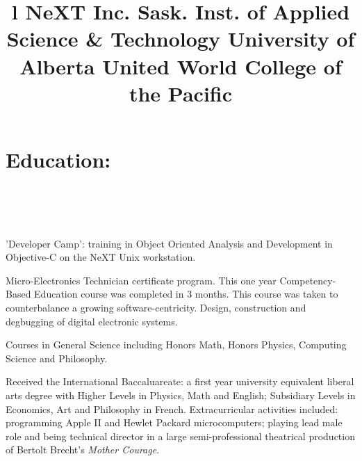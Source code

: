 \begin{resume}
\begin{position}
\end{position}


\section{Education:}

\begin{format}
\title{l}\\
\\
\body\\
\end{format}


\title{ NeXT Inc. }
\employer{}
\begin{position}
'Developer Camp': training in Object Oriented Analysis and Development in 
Objective-C on the NeXT Unix workstation.
\end{position}



\title{ Sask. Inst. of Applied Science \& Technology}
\begin{position}
Micro-Electronics Technician certificate program.  This one year
Competency-Based Education course was completed in 3 months.  This course
was taken to counterbalance a growing software-centricity.  Design, 
construction and degbugging of digital electronic systems.
\end{position}


\title{ University of Alberta}
\begin{position}
Courses in General Science including Honors Math, Honors Physics,
Computing Science and Philosophy.
\end{position}


\title{ United World College of the Pacific}
\begin{position}
Received the International Baccaluareate: a first year university 
equivalent liberal arts degree with Higher Levels in Physics, 
Math and English; Subsidiary Levels in Economics, Art and Philosophy 
in French.  Extracurricular activities included: 
programming Apple II and Hewlet Packard microcomputers; 
playing lead male role and being technical director in a large 
semi-professional theatrical production of 
Bertolt Brecht's {\it Mother Courage}.
\end{position}




\end{resume}
